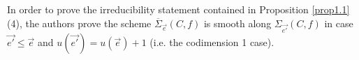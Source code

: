 \documentclass{article}
\DeclareMathOperator{\im}{im}
\DeclareMathOperator{\Fitt}{Fitt}
\theoremstyle{definition}
\theoremstyle{remark}
\begin{document}
In order to prove the irreducibility statement contained in Proposition \ref{prop1.1} (4), the authors prove the scheme $\overline {\Sigma} _{\overrightarrow {e}}(C,f)$ is smooth along $\Sigma _{\overrightarrow {e'}}(C,f)$ in case $\overrightarrow {e'} \leq \overrightarrow {e}$ and $u(\overrightarrow {e'})=u(\overrightarrow {e})+1$ (i.e. the codimension 1 case).
\end{document}
